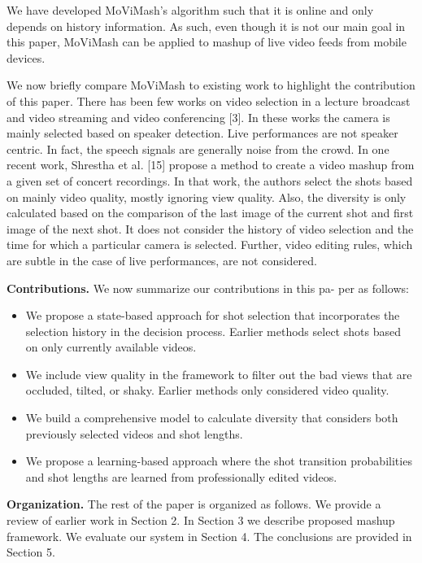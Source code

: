 \documentclass{sig-alternate}
\begin{document}
We have developed MoViMash’s algorithm such that it is online and only depends on history information. As such, even though it is not our main goal in this paper, MoViMash can be applied to mashup of live video feeds from mobile devices.

We now briefly compare MoViMash to existing work to highlight the contribution of this paper. There has been few works on video selection in a lecture broadcast and video streaming \cite{21} \cite{6} and video conferencing [3]. In these works the camera is mainly selected based on speaker detection. Live performances are not speaker centric. In fact, the speech signals are generally noise from the crowd. In one recent work, Shrestha et al. [15] propose a method to create a video mashup from a given set of concert recordings. In that work, the authors select the shots based on mainly video quality, mostly ignoring view quality. Also, the diversity is only calculated based on the comparison of the last image of the current shot and first image of the next shot. It does not consider the history of video selection and the time for which a particular camera is selected. Further, video editing rules, which are subtle in the case of live performances, are not considered.

\textbf{Contributions.} We now summarize our contributions in this pa-
per as follows:
\begin{itemize}
    \item We propose a state-based approach for shot selection that incorporates the selection history in the decision process. Earlier methods select shots based on only currently available videos.
    \item We include view quality in the framework to filter out the bad views that are occluded, tilted, or shaky. Earlier methods only considered video quality.
    \item We build a comprehensive model to calculate diversity that considers both previously selected videos and shot lengths.
    \item We propose a learning-based approach where the shot transition probabilities and shot lengths are learned from professionally edited videos.
\end{itemize}
\textbf{Organization.} The rest of the paper is organized as follows.
We provide a review of earlier work in Section 2. In Section 3 we
describe proposed mashup framework. We evaluate our system in
Section 4. The conclusions are provided in Section 5.
\end{document}
